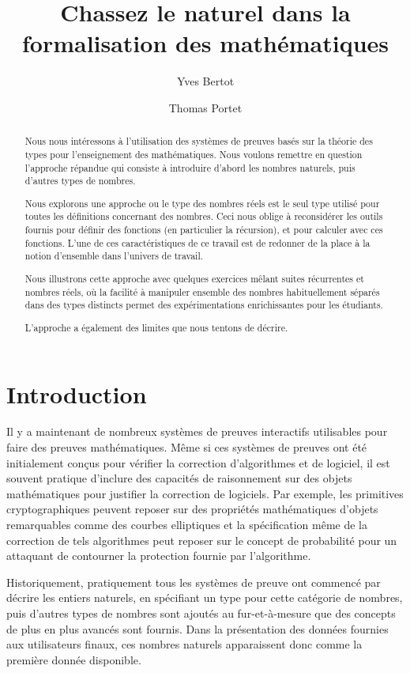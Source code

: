 \documentclass[draft]{jflart}
\title{Chassez le naturel dans la formalisation des mathématiques}
\author[1]{Yves Bertot}
\author[1]{Thomas Portet}
\affil[1]{Centre Inria de l'Université Côte d'Azur, France}
\begin{document}
\maketitle

\begin{abstract}
  Nous nous intéressons à l'utilisation des systèmes de preuves basés sur la
  théorie des types pour l'enseignement des mathématiques.  Nous voulons
  remettre en question l'approche répandue qui consiste à introduire
  d'abord les nombres naturels, puis d'autres types de nombres.

  Nous explorons une approche ou le type des nombres réels est le seul type
  utilisé pour toutes les définitions concernant des nombres.  Ceci nous oblige
  à reconsidérer les outils fournis pour définir des fonctions (en particulier
  la récursion), et pour calculer avec ces fonctions.
  L'une de ces caractéristiques de ce travail est de redonner de la place à
  la notion d'ensemble dans l'univers de travail.

  Nous illustrons cette approche avec quelques exercices mêlant suites
  récurrentes et nombres réels, où la facilité à manipuler ensemble des nombres
  habituellement séparés dans des types distincts permet des expérimentations
  enrichissantes pour les étudiants.

  L'approche a également des limites que nous tentons de décrire.
\end{abstract}

\section{Introduction}

Il y a maintenant de nombreux systèmes de preuves interactifs
utilisables pour faire des preuves mathématiques.  Même si ces
systèmes de preuves ont été initialement conçus pour vérifier la
correction d'algorithmes et de logiciel, il est souvent pratique
d'inclure des capacités de raisonnement sur des objets mathématiques
pour justifier la correction de logiciels.  Par exemple, les
primitives cryptographiques peuvent reposer sur des propriétés
mathématiques d'objets remarquables comme des courbes elliptiques et
la spécification même de la correction de tels algorithmes peut
reposer sur le concept de probabilité pour un attaquant de contourner
la protection fournie par l'algorithme.

Historiquement, pratiquement tous les systèmes de preuve ont commencé
par décrire les entiers naturels, en spécifiant un type pour cette
catégorie de nombres, puis d'autres types de nombres sont ajoutés au
fur-et-à-mesure que des concepts de plus en plus avancés sont fournis.
Dans la présentation des données fournies aux utilisateurs finaux, ces
nombres naturels apparaissent donc comme la première donnée
disponible.
\end{document}
